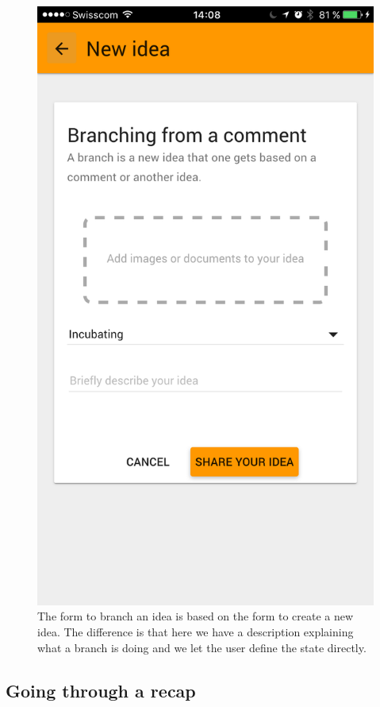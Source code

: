 \documentclass[a4paper,12pt,twoside]{article}
\begin{document}
\begin{figure}[!htb]
\begin{minipage}[t]{.32\textwidth}
        \includegraphics[width=\textwidth]{images/flow_branch_2.png}
        \caption{The form to branch an idea is based on the form to create a new idea. The difference is that here we have a description explaining what a branch is doing and we let the user define the state directly.}
    \end{minipage}
\end{figure}

\clearpage
\subsection{Going through a recap}
\label{sec.recapFlow}
\end{document}
